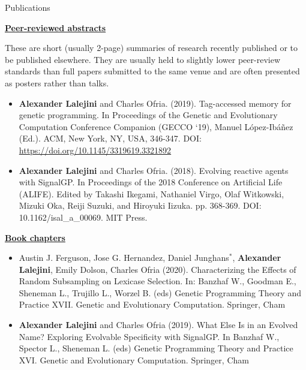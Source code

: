 \begin{rSection}{Publications}
\begin{itemize}
\end{itemize}

\underline{\large {\bf Peer-reviewed abstracts}}

These are short (usually 2-page) summaries of research recently published or to be published elsewhere.
They are usually held to slightly lower peer-review standards than full papers submitted to the same venue and are often presented as posters rather than talks.

\begin{itemize}

\item \textbf{Alexander Lalejini} and Charles Ofria. (2019).
Tag-accessed memory for genetic programming.
In Proceedings of the Genetic and Evolutionary Computation Conference Companion (GECCO ‘19), Manuel López-Ibáñez (Ed.).
ACM, New York, NY, USA, 346-347.
DOI: \url{https://doi.org/10.1145/3319619.3321892}

\item \textbf{Alexander Lalejini} and Charles Ofria. (2018).
Evolving reactive agents with SignalGP.
In Proceedings of the 2018 Conference on Artificial Life (ALIFE). Edited by Takashi Ikegami, Nathaniel Virgo, Olaf Witkowski, Mizuki Oka, Reiji Suzuki, and Hiroyuki Iizuka. pp. 368-369.
DOI: 10.1162/isal\_a\_00069. MIT Press.

\end{itemize}

\underline{\large {\bf Book chapters}}

\begin{itemize}

\item Austin J. Ferguson, Jose G. Hernandez, Daniel Junghans$^{*}$, \textbf{Alexander Lalejini}, Emily Dolson, Charles Ofria (2020).
Characterizing the Effects of Random Subsampling on Lexicase Selection.
In: Banzhaf W., Goodman E., Sheneman L., Trujillo L., Worzel B. (eds) Genetic Programming Theory and Practice XVII.
Genetic and Evolutionary Computation. Springer, Cham

\item \textbf{Alexander Lalejini} and Charles Ofria (2019).
What Else Is in an Evolved Name? Exploring Evolvable Specificity with SignalGP.
In Banzhaf W., Spector L., Sheneman L. (eds) Genetic Programming Theory and Practice XVI.
Genetic and Evolutionary Computation. Springer, Cham


\end{itemize}
\end{rSection}

